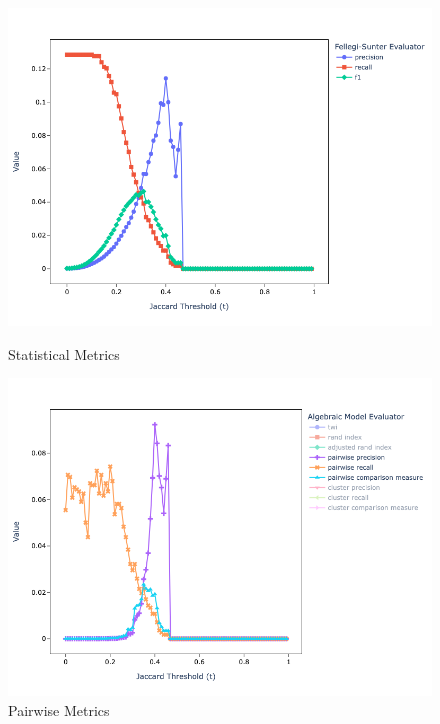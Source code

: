 \documentclass[11pt]{article}
\begin{document}
    \begin{figure}[h!]
        \begin{minipage}{0.49\textwidth}
            \centering
            \includegraphics[width=\textwidth]{full-fs}
            \caption{Statistical Metrics}
            \label{fig:full-fs}
        \end{minipage}    
        \begin{minipage}{0.49\textwidth}
            \centering
            \includegraphics[width=\textwidth]{full-alg-pp}
            \caption{Pairwise Metrics}
            \label{fig:full-alg-pp}
        \end{minipage}    
        \begin{minipage}{0.49\textwidth}

\end{minipage}
\end{figure}
\end{document}
